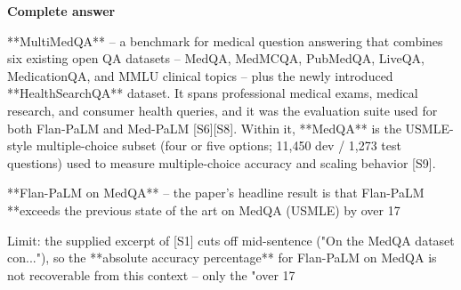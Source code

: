 \documentclass[10pt]{article}
\begin{document}
\textbf{Complete answer}
\begin{AnswerText}
**MultiMedQA** -- a benchmark for medical question answering that combines six existing open QA datasets -- MedQA, MedMCQA, PubMedQA, LiveQA, MedicationQA, and MMLU clinical topics -- plus the newly introduced **HealthSearchQA** dataset. It spans professional medical exams, medical research, and consumer health queries, and it was the evaluation suite used for both Flan-PaLM and Med-PaLM [S6][S8]. Within it, **MedQA** is the USMLE-style multiple-choice subset (four or five options; 11,450 dev / 1,273 test questions) used to measure multiple-choice accuracy and scaling behavior [S9].

**Flan-PaLM on MedQA** -- the paper's headline result is that Flan-PaLM **exceeds the previous state of the art on MedQA (USMLE) by over 17%

Limit: the supplied excerpt of [S1] cuts off mid-sentence ("On the MedQA dataset con..."), so the **absolute accuracy percentage** for Flan-PaLM on MedQA is not recoverable from this context -- only the "over 17%
\end{AnswerText}
\end{document}

